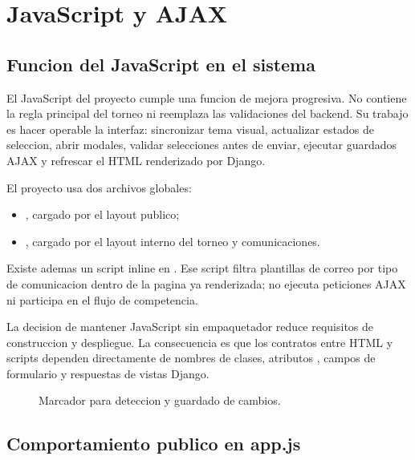 \chapter{JavaScript y AJAX}
\label{chap:javascript-ajax}

\section{Funcion del JavaScript en el sistema}
\label{sec:javascript-funcion}

El JavaScript del proyecto cumple una funcion de mejora progresiva. No contiene la regla principal del torneo ni reemplaza las validaciones del backend. Su trabajo es hacer operable la interfaz: sincronizar tema visual, actualizar estados de seleccion, abrir modales, validar selecciones antes de enviar, ejecutar guardados AJAX y refrescar el HTML renderizado por Django.

El proyecto usa dos archivos globales:

\begin{itemize}
  \item {}, cargado por el layout publico;
  \item {}, cargado por el layout interno del torneo y comunicaciones.
\end{itemize}

Existe ademas un script inline en . Ese script filtra plantillas de correo por tipo de comunicacion dentro de la pagina ya renderizada; no ejecuta peticiones AJAX ni participa en el flujo de competencia.

La decision de mantener JavaScript sin empaquetador reduce requisitos de construccion y despliegue. La consecuencia es que los contratos entre HTML y scripts dependen directamente de nombres de clases, atributos , campos de formulario y respuestas de vistas Django.

\begin{figure}[H]
  \centering
  \caption{Marcador para deteccion y guardado de cambios.}
  \label{fig:javascript-deteccion-guardado}
\end{figure}

\section{Comportamiento publico en app.js}
\label{sec:javascript-app}

